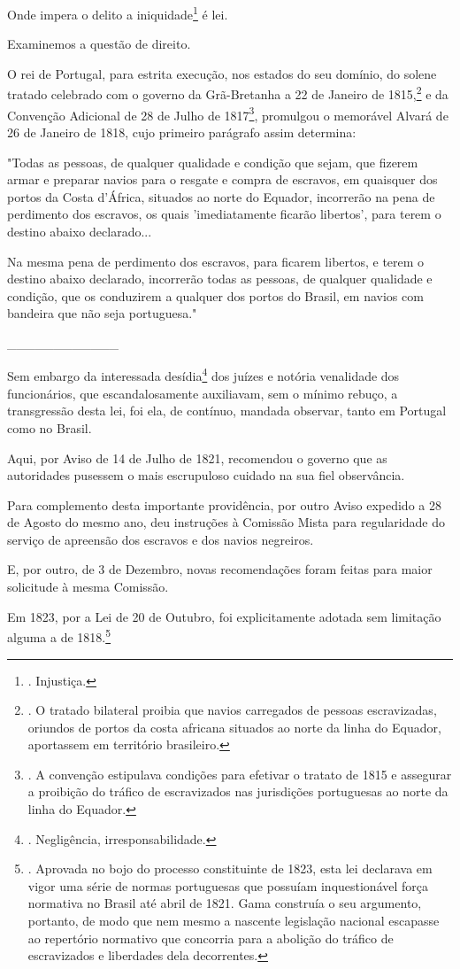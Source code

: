 Onde impera o delito a iniquidade\footnote{. Injustiça.} é lei.

Examinemos a questão de direito.

O rei de Portugal, para estrita execução, nos estados do seu domínio, do
solene tratado celebrado com o governo da Grã-Bretanha a 22 de Janeiro
de 1815,\footnote{. O tratado bilateral proibia que navios carregados de
  pessoas escravizadas, oriundos de portos da costa africana situados ao
  norte da linha do Equador, aportassem em território brasileiro.} e da
Convenção Adicional de 28 de Julho de 1817\footnote{. A convenção
  estipulava condições para efetivar o tratato de 1815 e assegurar a
  proibição do tráfico de escravizados nas jurisdições portuguesas ao
  norte da linha do Equador.}, promulgou o memorável Alvará de 26 de
Janeiro de 1818, cujo primeiro parágrafo assim determina:

"Todas as pessoas, de qualquer qualidade e condição que sejam, que
fizerem armar e preparar navios para o resgate e compra de escravos, em
quaisquer dos portos da Costa d'África, situados ao norte do Equador,
incorrerão na pena de perdimento dos escravos, os quais 'imediatamente
ficarão libertos', para terem o destino abaixo declarado...

Na mesma pena de perdimento dos escravos, para ficarem libertos, e terem
o destino abaixo declarado, incorrerão todas as pessoas, de qualquer
qualidade e condição, que os conduzirem a qualquer dos portos do Brasil,
em navios com bandeira que não seja portuguesa."

\_\_\_\_\_\_\_\_\_\_\_\_

Sem embargo da interessada desídia\footnote{. Negligência,
  irresponsabilidade.} dos juízes e notória venalidade dos funcionários,
que escandalosamente auxiliavam, sem o mínimo rebuço, a transgressão
desta lei, foi ela, de contínuo, mandada observar, tanto em Portugal
como no Brasil.

Aqui, por Aviso de 14 de Julho de 1821, recomendou o governo que as
autoridades pusessem o mais escrupuloso cuidado na sua fiel observância.

Para complemento desta importante providência, por outro Aviso expedido
a 28 de Agosto do mesmo ano, deu instruções à Comissão Mista para
regularidade do serviço de apreensão dos escravos e dos navios
negreiros.

E, por outro, de 3 de Dezembro, novas recomendações foram feitas para
maior solicitude à mesma Comissão.

Em 1823, por a Lei de 20 de Outubro, foi explicitamente adotada sem
limitação alguma a de 1818.\footnote{. Aprovada no bojo do processo
  constituinte de 1823, esta lei declarava em vigor uma série de normas
  portuguesas que possuíam inquestionável força normativa no Brasil até
  abril de 1821. Gama construía o seu argumento, portanto, de modo que
  nem mesmo a nascente legislação nacional escapasse ao repertório
  normativo que concorria para a abolição do tráfico de escravizados e
  liberdades dela decorrentes.}


